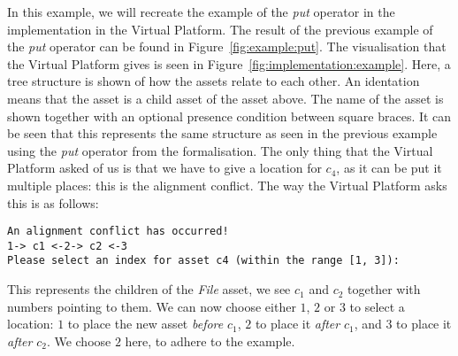 \begin{example}
  In this example, we will recreate the example of the \emph{put} operator in
  the implementation in the Virtual Platform. The result of the previous
  example of the \emph{put} operator can be found in Figure~\ref{fig:example:put}.
  The visualisation that the Virtual Platform gives is seen in Figure~\ref{fig:implementation:example}.
  Here, a tree structure is shown of how the assets relate to each other. An identation
  means that the asset is a child asset of the asset above. The name of the asset is shown
  together with an optional presence condition between square braces. 
  It can be seen that this represents the same structure as seen in the previous example
  using the \emph{put} operator from the formalisation.
  The only thing that the Virtual Platform asked of us is that we have to give a 
  location for $c_4$, as it can be put it multiple places: this is the alignment conflict.
  The way the Virtual Platform asks this is as follows:
  \begin{verbatim}
An alignment conflict has occurred!
1-> c1 <-2-> c2 <-3
Please select an index for asset c4 (within the range [1, 3]):
  \end{verbatim}
  This represents the children of the \emph{File} asset, we see $c_1$ and $c_2$ together
  with numbers pointing to them. We can now choose either $1$, $2$ or $3$ to select a
  location: $1$ to place the new asset \emph{before} $c_1$, $2$ to place it \emph{after}
  $c_1$, and $3$ to place it \emph{after} $c_2$. We choose $2$ here, to adhere to the example.
\end{example}